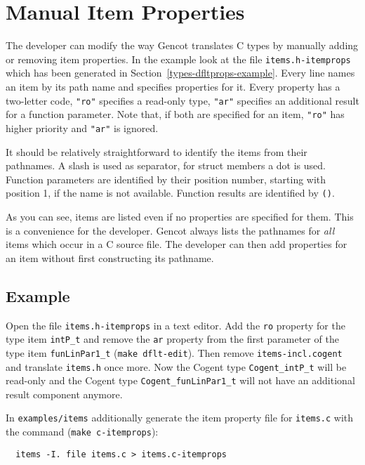 \documentclass[a4paper]{report}
\newcommand{\code}[1]{\textnormal{\texttt{#1}}}
\begin{document}
\section{Manual Item Properties}
\label{types-manprops}

The developer can modify the way Gencot translates C types by manually adding or removing item properties. In the example
look at the file \code{items.h-itemprops} which has been generated in Section~\ref{types-dfltprops-example}. Every line
names an item by its path name and specifies properties for it. Every property has a two-letter code, \code{"ro"} specifies
a read-only type, \code{"ar"} specifies an additional result for a function parameter. Note that, if both are specified 
for an item, \code{"ro"} has higher priority and \code{"ar"} is ignored.

It should be relatively straightforward to identify the items from their pathnames. A slash is used as separator, for struct 
members a dot is used. Function parameters are identified by their position number, starting with position 1, if the name
is not available. Function results are identified by \code{()}.

As you can see, items are listed even if no properties are specified for them. This is a convenience for the developer. Gencot
always lists the pathnames for \textit{all} items which occur in a C source file. The developer can then add properties for
an item without first constructing its pathname.

\subsection{Example}
\label{types-manprops-example}

Open the file \code{items.h-itemprops} in a text editor. Add the \code{ro} property for the type item \code{intP\_t} and
remove the \code{ar} property from the first parameter of the type item \code{funLinPar1\_t} (\code{make dflt-edit}). Then 
remove \code{items-incl.cogent} and translate \code{items.h} once more. Now the Cogent type \code{Cogent\_intP\_t} will
be read-only and the Cogent type \code{Cogent\_funLinPar1\_t} will not have an additional result component anymore.

In \code{examples/items} additionally
generate the item property file for \code{items.c} with the command (\code{make c-itemprops}):
\begin{verbatim}
  items -I. file items.c > items.c-itemprops
\end{verbatim}
\end{document}
